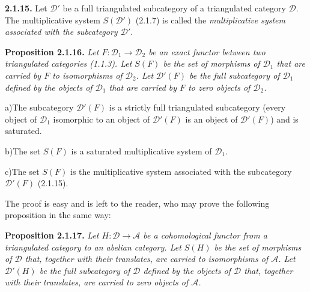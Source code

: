 \clearpage
{}%
\begingroup
\small
\setlength{\emergencystretch}{1.5em}%
\setlength{\abovedisplayskip}{1pt plus 1pt minus 1pt}%
\setlength{\belowdisplayskip}{1pt plus 1pt minus 1pt}%

\noindent\textbf{2.1.15.}\quad
{}%
Let $\mathcal D'$ be a full triangulated subcategory of a triangulated
category $\mathcal D$. The multiplicative system $S(\mathcal D')$ (2.1.7) is
called the \emph{multiplicative system associated with the subcategory
$\mathcal D'$}.

\smallskip
\noindent\textbf{Proposition 2.1.16.}\quad
\begingroup\itshape
{}%
Let $F\colon\mathcal D_1\to\mathcal D_2$ be an exact functor between two
triangulated categories (1.1.3). Let $S(F)$ be the set of morphisms of
$\mathcal D_1$ that are carried by $F$ to isomorphisms of $\mathcal D_2$.
%
Let $\mathcal D'(F)$ be the full subcategory of $\mathcal D_1$ defined by the
objects of $\mathcal D_1$ that are carried by $F$ to zero objects of
$\mathcal D_2$.

\par\noindent\hspace*{2em}a)\enspace The subcategory $\mathcal D'(F)$ is a
strictly full triangulated subcategory (every object of $\mathcal D_1$
isomorphic to an object of $\mathcal D'(F)$ is an object of
$\mathcal D'(F)$) and is saturated.

\par\noindent\hspace*{2em}b)\enspace The set $S(F)$ is a saturated
multiplicative system of $\mathcal D_1$.

\par\noindent\hspace*{2em}c)\enspace The set $S(F)$ is the multiplicative
system associated with the subcategory $\mathcal D'(F)$ (2.1.15).
\par\endgroup

\noindent The proof is easy and is left to the reader, who may prove the
following proposition in the same way:

\smallskip
\noindent\textbf{Proposition 2.1.17.}\quad
\begingroup\itshape
{}%
Let $H\colon\mathcal D\to\mathcal A$ be a cohomological functor from a
triangulated category to an abelian category. Let $S(H)$ be the set of
morphisms of $\mathcal D$ that, together with their translates, are carried
to isomorphisms of $\mathcal A$.
%
Let $\mathcal D'(H)$ be the full subcategory of $\mathcal D$ defined by the
objects of $\mathcal D$ that, together with their translates, are carried to
zero objects of $\mathcal A$.

